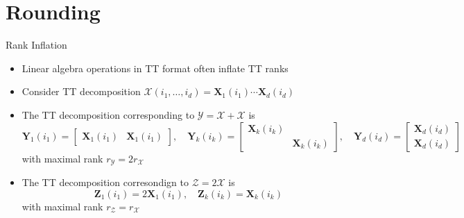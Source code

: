 \documentclass[aspectratio=169]{beamer}
\newcommand{\Mat}[1]{\mathbf{#1}}
\newcommand{\Tns}[1]{\mathcal{#1}}
\begin{document}
\section{Rounding}

\begin{frame}{Rank Inflation}
  \begin{itemize}
    \item
      Linear algebra operations in TT format often inflate TT ranks
    \item
      Consider TT decomposition $\Tns{X}(i_1, \ldots, i_d) = \Mat{X}_1(i_1)
      \cdots \Mat{X}_d(i_d)$
    \item
      The TT decomposition corresponding to $\Tns{Y} = \Tns{X} + \Tns{X}$ is
      \begin{equation*}
        \Mat{Y}_1(i_1) =
        \begin{bmatrix}
          \Mat{X}_1(i_1) & \Mat{X}_1(i_1)
        \end{bmatrix},
        \quad \Mat{Y}_k(i_k) =
        \begin{bmatrix}
          \Mat{X}_k(i_k) & \\
                         & \Mat{X}_k(i_k)
        \end{bmatrix},
        \quad \Mat{Y}_d(i_d) =
        \begin{bmatrix}
          \Mat{X}_d(i_d) \\
          \Mat{X}_d(i_d)
        \end{bmatrix}
      \end{equation*}
      with maximal rank $r_{\Tns{Y}} = 2 r_{\Tns{X}}$
    \item
      The TT decomposition corresondign to $\Tns{Z} = 2 \Tns{X}$ is
      \begin{equation*}
        \Mat{Z}_1(i_1) = 2 \Mat{X}_1(i_1), \quad \Mat{Z}_k(i_k) = \Mat{X}_k(i_k)
      \end{equation*}
      with maximal rank $r_{\Tns{Z}} = r_{\Tns{X}}$
  \end{itemize}
\end{frame}
\end{document}

